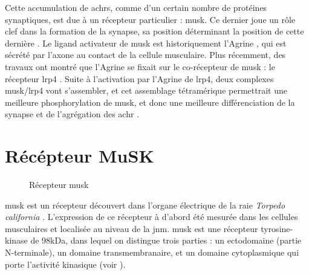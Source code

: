 	Cette accumulation de \glspl{achr}, comme d'un certain nombre de protéines synaptiques, est due à un récepteur particulier : \gls{musk}. Ce dernier joue un rôle clef dans la formation de la synapse, sa position déterminant la position de cette dernière \cite{DeChiara1996, Glass1996}. Le ligand activateur de \gls{musk} est historiquement l'Agrine \cite{Glass1996}, qui est sécrété par l'axone au contact de la cellule musculaire. Plus récemment, des travaux ont montré que l'Agrine se fixait sur le co-récepteur de \gls{musk} : le récepteur \gls{lrp}4 \cite{Zhang2008, Kim2008}. Suite à l'activation par l'Agrine de \gls{lrp}4, deux complexes \gls{musk}/\gls{lrp}4 vont s'assembler, et cet assemblage tétramérique permettrait une meilleure phosphorylation de \gls{musk}, et donc une meilleure différenciation de la synapse et de l'agrégation des \gls{achr} \cite{Zong2012}.
	
\section{Récépteur MuSK}
	\label{sec:IntroMuSK}
	
	\begin{figure}
		\caption{Récepteur \gls{musk}}
		\label{fig:RMuSK}
	\end{figure}

	\gls{musk} est un récepteur découvert dans l'organe électrique de la raie \emph{Torpedo california} \cite{Jennings1993}. L'expression de ce récepteur à d'abord été mesurée dans les cellules musculaires et localisée au niveau de la \gls{jnm}. \gls{musk} est une récepteur tyrosine-kinase de 98kDa, dans lequel on distingue trois parties : un ectodomaine (partie N-terminale), un domaine transmembranaire, et un domaine cytoplasmique qui porte l'activité kinasique (voir ). 
	
